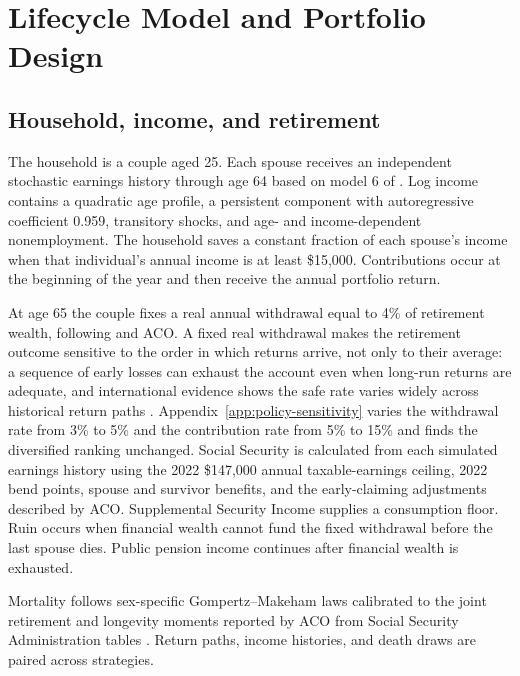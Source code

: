 \documentclass[11pt]{article}
\begin{document}
\section{Lifecycle Model and Portfolio Design}

\subsection{Household, income, and retirement}
\label{sec:methods-household}

The household is a couple aged 25. Each spouse receives an independent
stochastic earnings history through age 64 based on model 6 of
\citet{GuvenenKarahanOzkanSong2021}. Log income contains a quadratic age
profile, a persistent component with autoregressive coefficient 0.959,
transitory shocks, and age- and income-dependent nonemployment. The household
saves a constant fraction of each spouse's income when that individual's
annual income is at least \$15,000. Contributions occur at the beginning of
the year and then receive the annual portfolio return.

At age 65 the couple fixes a real annual withdrawal equal to 4\% of retirement
wealth, following \citet{Bengen1994} and ACO. A fixed real withdrawal makes the
retirement outcome sensitive to the order in which returns arrive, not only to
their average: a sequence of early losses can exhaust the account even when
long-run returns are adequate, and international evidence shows the safe rate
varies widely across historical return paths \citep{Estrada2018}.
Appendix~\ref{app:policy-sensitivity} varies the withdrawal rate from 3\% to
5\% and the contribution rate from 5\% to 15\% and finds the diversified
ranking unchanged. Social
Security is calculated from each simulated earnings history using the 2022
\$147{,}000 annual taxable-earnings ceiling, 2022 bend points, spouse and
survivor benefits, and the early-claiming adjustments described by ACO.
Supplemental Security Income supplies a consumption floor.
Ruin occurs when financial wealth cannot fund the fixed withdrawal before the
last spouse dies. Public pension income continues after financial wealth is
exhausted.

Mortality follows sex-specific Gompertz--Makeham laws calibrated to the joint
retirement and longevity moments reported by ACO from Social Security
Administration tables \citep{SSA2020}. Return paths, income histories, and
death draws are paired across strategies.
\end{document}
